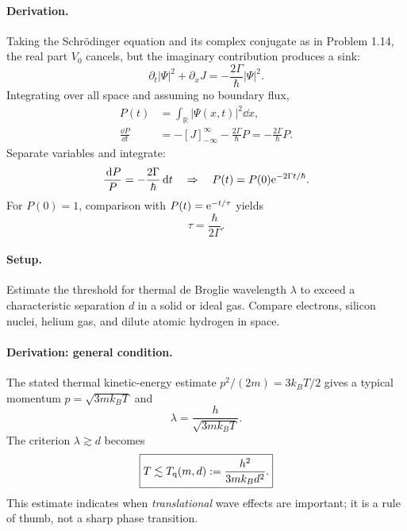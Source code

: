 \paragraph{Derivation.}
Taking the Schrödinger equation and its complex conjugate as in Problem 1.14, the real part $V_0$ cancels, but the imaginary contribution produces a sink:
\begin{equation}
\partial_t|\Psi|^2+\partial_xJ
=-\frac{2\Gamma}{\hbar}|\Psi|^2.
\end{equation}
Integrating over all space and assuming no boundary flux,
\begin{align}
P(t)&=\int_{\mathbb R}|\Psi(x,t)|^2\dd x,\\
\frac{\dd P}{\dd t}&=-[J]_{-\infty}^{\infty}
-\frac{2\Gamma}{\hbar}P
=\boxed{-\frac{2\Gamma}{\hbar}P}.
\end{align}
Separate variables and integrate:
\begin{equation}
\frac{\,\mathrm{d} P}{P}=-\frac{2\Gamma}{\hbar}\,\mathrm{d} t
\quad\Rightarrow\quad P(t)=P(0)\mathrm{e}^{-2\Gamma t/\hbar}.
\end{equation}
For $P(0)=1$, comparison with $P(t)=\mathrm{e}^{-t/\tau}$ yields
\begin{equation}
\boxed{\tau=\frac{\hbar}{2\Gamma}}.
\end{equation}

\paragraph{Setup.} Estimate the threshold for thermal de Broglie wavelength $\lambda$ to exceed a characteristic separation $d$ in a solid or ideal gas. Compare electrons, silicon nuclei, helium gas, and dilute atomic hydrogen in space.
\paragraph{Derivation: general condition.}
The stated thermal kinetic-energy estimate $p^2/(2m)=3k_BT/2$ gives a typical momentum $p=\sqrt{3mk_BT}$ and
\begin{equation}
\boxed{\lambda=\frac{h}{\sqrt{3mk_BT}}}.
\end{equation}
The criterion $\lambda\gtrsim d$ becomes
\begin{equation}
\boxed{T\lesssim T_{\rm q}(m,d):=\frac{h^2}{3mk_Bd^2}.}
\end{equation}
This estimate indicates when \emph{translational} wave effects are important; it is a rule of thumb, not a sharp phase transition.
